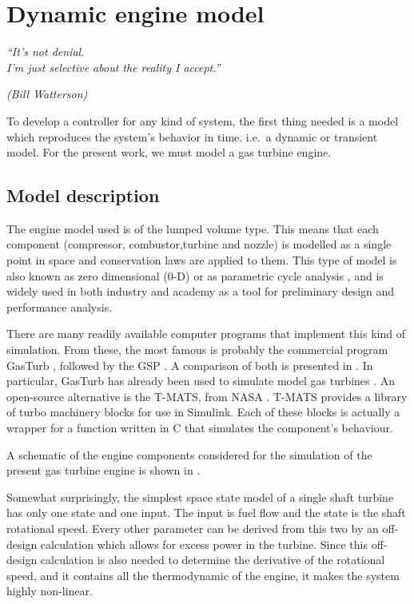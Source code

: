 \documentclass[tcc]{subfiles}
\begin{document}
\chapter{Dynamic engine model}
\label{ch:engine_model}
\epigraph{\em ``It's not denial.\\ I'm just selective about the reality I
accept.''}{\em(Bill Watterson)}

To develop a controller for any kind of system,
 the first thing needed is a model which reproduces the system's behavior in time.
 i.e.\ a dynamic or transient model.
 For the present work, we must model a gas turbine engine.

\section{Model description}
The engine model used is of the lumped volume type. This means that each component 
 (compressor, combustor,turbine and nozzle)
 is modelled as a single point in space and conservation laws are applied to them.
 This type of model is also known as zero dimensional (0-D) or as parametric cycle analysis
 ,
 and is widely used in both industry and academy as a tool for preliminary design and 
 performance analysis. 

There are many readily available computer programs that implement this kind of simulation. 
From these, the most famous is probably the commercial program GasTurb \cite{GasTurb}, 
 
followed by the \gls{GSP} \cite{GSP}.
A comparison of both is presented in \textcite{GasTurbvsGSP}.
In particular, GasTurb has already been used to simulate model gas turbines 
 \cite{gao2011modelling}.
An open-source alternative is the \gls{T-MATS}, from NASA \cite{T-MATS}.
\gls{T-MATS} provides a library of turbo machinery blocks for use in Simulink. 
Each of these blocks is actually a wrapper for a function written in C 
 that simulates the component's behaviour.

A schematic of the engine components considered for the simulation of the present gas turbine engine is shown in .

Somewhat surprisingly,
 the simplest space state model of a single shaft turbine has only one state and one input.
 The input is fuel flow and the state is the shaft rotational speed.
 Every other parameter can be derived from this two by an off-design calculation
 which allows for excess power in the turbine.
 Since this off-design calculation is also needed to determine the derivative of the rotational speed,
 and it contains all the thermodynamic of the engine, it makes the system highly non-linear.
\end{document}
